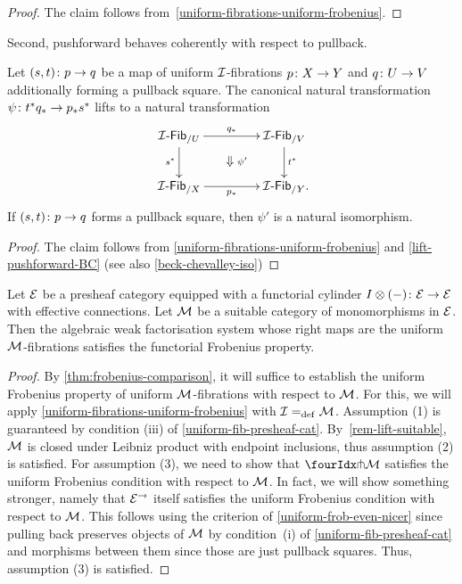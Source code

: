 \documentclass[reqno,10pt,a4paper,oneside,draft]{amsart}
\begin{document}
\begin{proof}
The claim follows from~\cref{uniform-fibrations-uniform-frobenius}.
\end{proof}

Second, pushforward behaves coherently with respect to pullback.

\begin{corollary} \label{uniform-fibrations-BC-pushforward}
Let $(s, t) \co p \to q$ be a map of uniform $\cal{I}$-fibrations $p \co X \to Y$ and $q \co U \to V$ additionally forming a pullback square.
The canonical natural transformation $\psi \co t^* q_* \to p_* s^*$ lifts to a natural transformation
\[
\xymatrix@C+2em{
  \Fib{\cal{I}}_{/U}
  \ar[r]^{q_*}
  \ar[d]_{s^*}
  \ar@{}[dr]|{\textstyle\Downarrow \rlap{$\labelstyle \psi'$}}
&
  \Fib{\cal{I}}_{/V}
  \ar[d]^{t^*}
\\
  \Fib{\cal{I}}_{/X}
  \ar[r]_{p_*}
&
  \Fib{\cal{I}}_{/Y}
\rlap{.}}
\]
If $(s, t) \co p \to q$ forms a pullback square, then $\psi'$ is a natural isomorphism.
\end{corollary}

\begin{proof}
The claim follows from \cref{uniform-fibrations-uniform-frobenius} and \cref{lift-pushforward-BC} (see also \cref{beck-chevalley-iso})
\end{proof}

\begin{theorem} 
\label{frobenius-uniform-presheaf}
Let $\catE$ be a presheaf category equipped with a functorial cylinder
$I \otimes (-) \co \catE \to \catE$ with effective connections. 
Let $\cal{M}$ be a suitable category of monomorphisms in $\catE$. 
Then the algebraic weak factorisation system 
whose right maps are the uniform $\cal{M}$-fibrations satisfies
the functorial Frobenius property. 
\end{theorem}

\begin{proof} 
By \cref{thm:frobenius-comparison}, it will suffice to establish the uniform Frobenius property of uniform $\cal{M}$-fibrations with respect to $\cal{M}$.
For this, we will apply \cref{uniform-fibrations-uniform-frobenius} with $\cal{I} \defeq \cal{M}$.
Assumption (1) is guaranteed by condition (iii) of \cref{uniform-fib-presheaf-cat}. 
By~\cref{rem-lift-suitable}, $\cal{M}$ is closed under Leibniz product with endpoint inclusions, thus assumption (2) is satisfied. For assumption (3), we need to show that $\liftr{\cal{M}}$ satisfies the uniform Frobenius condition with respect to $\cal{M}$.
In fact, we will show something stronger, namely that $\catE^\to$ itself satisfies the uniform Frobenius condition with respect to $\cal{M}$.
This follows using the criterion of \cref{uniform-frob-even-nicer} since pulling back preserves objects of $\cal{M}$ by condition~(i) of \cref{uniform-fib-presheaf-cat} and morphisms between them since those are just pullback squares. Thus, assumption (3) is satisfied.
\end{proof} 
\end{document}
